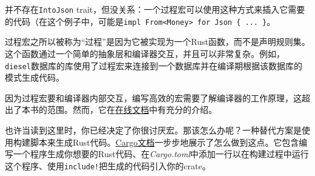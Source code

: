 并不存在\texttt{IntoJson} trait，但没关系：一个过程宏可以使用这种方式来插入它需要的代码（在这个例子中，可能是\texttt{impl From<Money> for Json \{ ... \}}。

过程宏之所以被称为“过程”是因为它被实现为一个Rust函数，而不是声明规则集。这个函数通过一个简单的抽象层和编译器交互，并且可以非常复杂。例如，\texttt{diesel}数据库的库使用了过程宏来连接到一个数据库并在编译期根据该数据库的模式生成代码。

因为过程宏要和编译器内部交互，编写高效的宏需要了解编译器的工作原理，这超出了本书的范围。然而，它在\href{https://doc.rust-lang.org/book/ch19-06-macros.html\#procedural-macros-for-generating-code-from-attributes}{在线文档}中有充分的介绍。

也许当读到这里时，你已经决定了你很讨厌宏。那该怎么办呢？一种替代方案是使用构建脚本来生成Rust代码。\href{https://doc.crates.io/build-script.html\#case-study-code-generation}{Cargo文档}一步步地展示了怎么做到这点。它包含编写一个程序生成你想要的Rust代码、在\emph{Cargo.toml}中添加一行以在构建过程中运行这个程序、使用\texttt{include!}把生成的代码引入你的crate。
